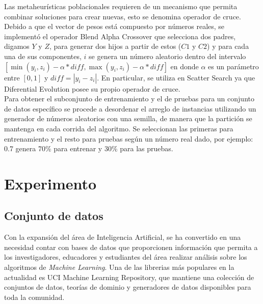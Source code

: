\documentclass{ci5652}
\begin{document}
Las metaheurísticas poblacionales requieren de un mecanismo que permita combinar
soluciones para crear nuevas, esto se denomina operador de cruce. Debido a que
el vector de pesos está compuesto por números reales, se implementó el operador
Blend Alpha Crossover que selecciona dos padres, digamos $Y$ y $Z$, para generar
dos hijos a partir de estos ($C1$ y $C2$) y para cada una de sus componentes,
$i$ se genera un número aleatorio dentro del intervalo
$[\min(y_i, z_i) - \alpha*diff,\max(y_i, z_i) - \alpha*diff]$ en donde $\alpha$
es un parámetro entre $[0,1]$ y $diff = |y_i - z_i|$. En particular, se utiliza
en Scatter Search ya que Diferential Evolution posee su propio operador de
cruce.\\

Para obtener el subconjunto de entrenamiento y el de pruebas para un conjunto de
datos específico se procede a desordenar el arreglo de instancias utilizando un
generador de números aleatorios con una semilla, de manera que la partición se
mantenga en cada corrida del algoritmo. Se seleccionan las primeras para
entrenamiento y el resto para pruebas según un número real dado, por ejemplo:
0.7 genera 70\% para entrenar y 30\% para las pruebas.\\



\section{Experimento}


\subsection{Conjunto de datos}

Con la expansión del área de Inteligencia Artificial, se ha convertido en una
necesidad contar con bases de datos que proporcionen información que permita a
los investigadores, educadores y estudiantes del área realizar análisis sobre
los algoritmos de \textit{Machine Learning}. Una de las librerias más populares
en la actualidad es UCI Machine Learning Repository, que mantiene una colección
de conjuntos de datos, teorías de dominio y generadores de datos disponibles
para toda la comunidad.\\
\end{document}
